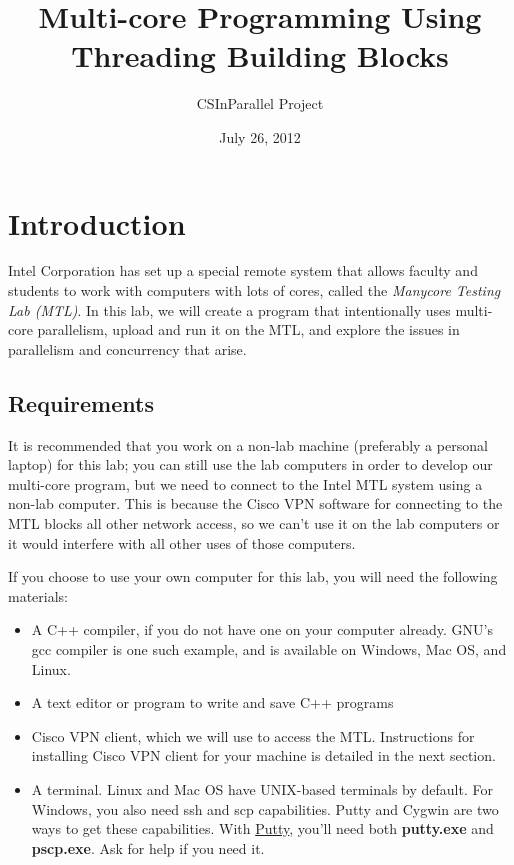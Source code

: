 \documentclass[letterpaper,10pt,openany,oneside]{sphinxmanual}
\title{Multi-core Programming Using Threading Building Blocks}
\date{July 26, 2012}
\author{CSInParallel Project}
\begin{document}
\maketitle
\tableofcontents
{}\label{index::doc}



\chapter{Introduction}
\label{Introduction/Introduction:introduction}\label{Introduction/Introduction::doc}\label{Introduction/Introduction:multi-core-programming-using-threading-building-blocks}
Intel Corporation has set up a special remote system that allows faculty and students to work with computers with lots of cores, called the \emph{Manycore Testing Lab (MTL)}. In this lab, we will create a program that intentionally uses multi-core parallelism, upload and run it on the MTL, and explore the issues in parallelism and concurrency that arise.


\section{Requirements}
\label{Introduction/Introduction:requirements}
It is recommended that you work on a non-lab machine (preferably a personal laptop) for this lab; you can still use the lab computers in order to develop our multi-core program, but we need to connect to the Intel MTL system using a non-lab computer. This is because the Cisco VPN software for connecting to the MTL blocks all other network access, so we can't use it on the lab computers or it would interfere with all other uses of those computers.

If you choose to use your own computer for this lab, you will need the following materials:
\begin{itemize}
\item {} 
A C++ compiler, if you do not have one on your computer already.  GNU's gcc compiler is one such example, and is available on Windows, Mac OS, and Linux.

\item {} 
A text editor or program to write and save C++ programs

\item {} 
Cisco VPN client, which we will use to access the MTL. Instructions for installing Cisco VPN client for your machine is detailed in the next section.

\item {} 
A terminal. Linux and Mac OS have UNIX-based terminals by default. For Windows, you also need ssh and scp capabilities. Putty and Cygwin are two ways to get these capabilities. With \href{http://www.chiark.greenend.org.uk/~sgtatham/putty/download.html}{Putty}, you'll need both \textbf{putty.exe} and \textbf{pscp.exe}. Ask for help if you need it.

\end{itemize}
\end{document}
